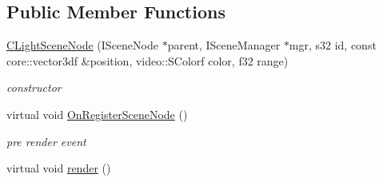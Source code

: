 \subsection*{Public Member Functions}
\begin{DoxyCompactItemize}
\item 
\hypertarget{classirr_1_1scene_1_1_c_light_scene_node_a3b0927a28311902af4d19304b50b8adb}{\hyperlink{classirr_1_1scene_1_1_c_light_scene_node_a3b0927a28311902af4d19304b50b8adb}{C\-Light\-Scene\-Node} (I\-Scene\-Node $\ast$parent, I\-Scene\-Manager $\ast$mgr, s32 id, const core\-::vector3df \&position, video\-::\-S\-Colorf color, f32 range)}\label{classirr_1_1scene_1_1_c_light_scene_node_a3b0927a28311902af4d19304b50b8adb}

\begin{DoxyCompactList}\small\item\em constructor \end{DoxyCompactList}\item 
\hypertarget{classirr_1_1scene_1_1_c_light_scene_node_a123801a3988d8836319212aaf12be3ba}{virtual void \hyperlink{classirr_1_1scene_1_1_c_light_scene_node_a123801a3988d8836319212aaf12be3ba}{On\-Register\-Scene\-Node} ()}\label{classirr_1_1scene_1_1_c_light_scene_node_a123801a3988d8836319212aaf12be3ba}

\begin{DoxyCompactList}\small\item\em pre render event \end{DoxyCompactList}\item 
\hypertarget{classirr_1_1scene_1_1_c_light_scene_node_a25605479d8c73ecbed83a5d7dc325eae}{virtual void \hyperlink{classirr_1_1scene_1_1_c_light_scene_node_a25605479d8c73ecbed83a5d7dc325eae}{render} ()}\label{classirr_1_1scene_1_1_c_light_scene_node_a25605479d8c73ecbed83a5d7dc325eae}


\end{DoxyCompactItemize}
